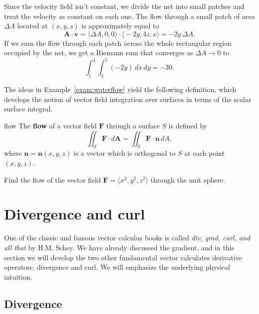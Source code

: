 \documentclass[svgnames]{report}
\begin{document}
\begin{solution}
  Since the velocity field isn't constant, we divide the net into
  small patches and treat the velocity as constant on each one.  The
  flow through a small patch of area $\Delta A$ located at $(x,y,z)$
  is approximately equal to
  \[
    \mathbf{A} \cdot \mathbf{v} = \big\langle \Delta A, 0, 0 \big\rangle \cdot
    \big\langle -2y, 4z, x \big\rangle = -2y \, \Delta A. 
  \]
  If we sum the flow through each patch across the whole rectangular
  region occupied by the net, we get a Riemann sum that converges as
  $\Delta A \to 0$ to
  \[
    \int_1^4 \int_3^5 (-2y) \, dx \, dy = \boxed{-30}. 
  \]
\end{solution}

The ideas in Example~\ref{exam:waterflow} yield the following
definition, which develops the notion of vector field integration over
surfaces in terms of the scalar surface integral. 

\begin{defn}{}{flow}
  The \textbf{flow} of a vector field $\mathbf{F}$ through a surface
  $S$ is defined by
  \[
    \iint_S \mathbf{F} \cdot d\mathbf{A} =  \iint_S \mathbf{F} \cdot \mathbf{n}
    \, dA, 
  \]
  where $\mathbf{n}=\mathbf{n}(x,y,z)$ is a vector which is
  orthogonal to $S$ at each point $(x,y,z)$. 
\end{defn}

\begin{exercise}{}{}
  Find the flow of the vector field $\mathbf{F} = \langle x^2, y^2, z^2 \rangle$
  through the unit sphere. 
\end{exercise}

\section{Divergence and curl}

One of the classic and famous vector calculus books is called \textit{div,
  grad, curl, and all that} by H.M. Schey. We have already discussed the gradient,
and in this section we will develop the two other fundamental vector
calculates derivative operators: divergence and curl. We will
emphasize the underlying physical intuition. 

\subsection{Divergence}

\end{document}
